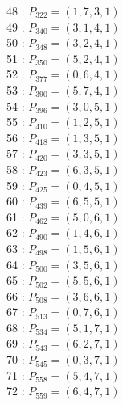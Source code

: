 \documentclass{article}
\begin{document}
{\begin{multicols}{3}
48 : $P_{322}=( 1, 7, 3, 1 )$\\
49 : $P_{340}=( 3, 1, 4, 1 )$\\
50 : $P_{348}=( 3, 2, 4, 1 )$\\
51 : $P_{350}=( 5, 2, 4, 1 )$\\
52 : $P_{377}=( 0, 6, 4, 1 )$\\
53 : $P_{390}=( 5, 7, 4, 1 )$\\
54 : $P_{396}=( 3, 0, 5, 1 )$\\
55 : $P_{410}=( 1, 2, 5, 1 )$\\
56 : $P_{418}=( 1, 3, 5, 1 )$\\
57 : $P_{420}=( 3, 3, 5, 1 )$\\
58 : $P_{423}=( 6, 3, 5, 1 )$\\
59 : $P_{425}=( 0, 4, 5, 1 )$\\
60 : $P_{439}=( 6, 5, 5, 1 )$\\
61 : $P_{462}=( 5, 0, 6, 1 )$\\
62 : $P_{490}=( 1, 4, 6, 1 )$\\
63 : $P_{498}=( 1, 5, 6, 1 )$\\
64 : $P_{500}=( 3, 5, 6, 1 )$\\
65 : $P_{502}=( 5, 5, 6, 1 )$\\
66 : $P_{508}=( 3, 6, 6, 1 )$\\
67 : $P_{513}=( 0, 7, 6, 1 )$\\
68 : $P_{534}=( 5, 1, 7, 1 )$\\
69 : $P_{543}=( 6, 2, 7, 1 )$\\
70 : $P_{545}=( 0, 3, 7, 1 )$\\
71 : $P_{558}=( 5, 4, 7, 1 )$\\
72 : $P_{559}=( 6, 4, 7, 1 )$\\
\end{multicols}


%


%


}%
\end{document}
